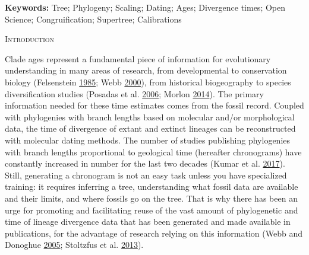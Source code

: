 \documentclass[]{article}
\begin{document}
\textbf{Keywords:} Tree; Phylogeny; Scaling; Dating; Ages; Divergence times; Open Science; Congruification; Supertree; Calibrations
\newpage

\begin{center}
\textsc{Introduction}
\end{center}

Clade ages represent a fundamental piece of information for evolutionary
understanding in many areas of research, from developmental to conservation biology (Felsenstein \protect\hyperlink{ref-Felsenstein1985a}{1985}; Webb \protect\hyperlink{ref-Webb2000}{2000}), from historical biogeography to species diversification studies (Posadas et al. \protect\hyperlink{ref-posadas2006historical}{2006}; Morlon \protect\hyperlink{ref-Morlon2014}{2014}). The primary information needed for these time estimates comes from the fossil record. Coupled with phylogenies with branch lengths based on molecular and/or morphological data, the time of divergence of extant and extinct lineages can be reconstructed with molecular dating methods.
The number of studies publishing phylogenies with branch lengths proportional to geological time (hereafter chronograms) have constantly increased in number for the last two decades (Kumar et al. \protect\hyperlink{ref-Kumar2017}{2017}).
Still, generating a chronogram is not an easy task unless you have specialized training: it requires inferring a tree, understanding what fossil data are available and their limits, and where fossils go on the tree. That is why there has been an urge for promoting and facilitating reuse of the vast amount of phylogenetic and time of lineage divergence data that has been generated and made available in publications, for the advantage of research relying on this information (Webb and Donoghue \protect\hyperlink{ref-webb2005phylomatic}{2005}; Stoltzfus et al. \protect\hyperlink{ref-Stoltzfus2013}{2013}).
\end{document}
